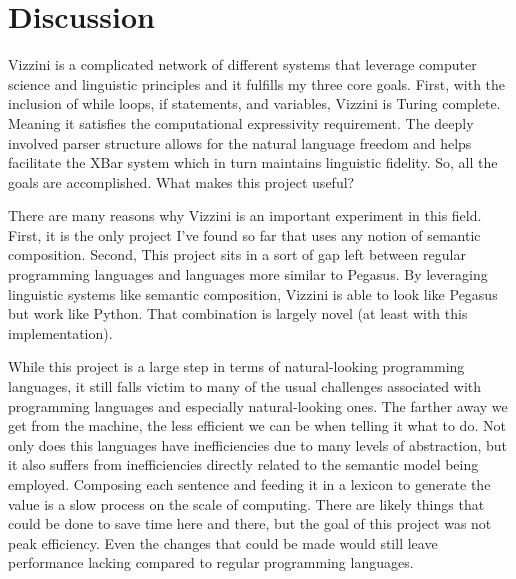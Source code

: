 \documentclass[titlepage]{article}
\newcommand{\langName}{Vizzini}
\begin{document}
\section*{Discussion}
\langName{} is a complicated network of different systems that leverage computer science and linguistic principles and it fulfills my three core goals. First, with the inclusion of while loops, if statements, and variables, \langName{} is Turing complete. Meaning it satisfies the computational expressivity requirement. The deeply involved parser structure allows for the natural language freedom and helps facilitate the XBar system which in turn maintains linguistic fidelity. So, all the goals are accomplished. What makes this project useful?

There are many reasons why \langName{} is an important experiment in this field. First, it is the only project I've found so far that uses any notion of semantic composition. Second, This project sits in a sort of gap left between regular programming languages and languages more similar to Pegasus. By leveraging linguistic systems like semantic composition, \langName{} is able to look like Pegasus but work like Python. That combination is largely novel (at least with this implementation).

While this project is a large step in terms of natural-looking programming languages, it still falls victim to many of the usual challenges associated with programming languages and especially natural-looking ones. The farther away we get from the machine, the less efficient we can be when telling it what to do. Not only does this languages have inefficiencies due to many levels of abstraction, but it also suffers from inefficiencies directly related to the semantic model being employed. Composing each sentence and feeding it in a lexicon to generate the value is a slow process on the scale of computing. There are likely things that could be done to save time here and there, but the goal of this project was not peak efficiency. Even the changes that could be made would still leave performance lacking compared to regular programming languages.
\end{document}

